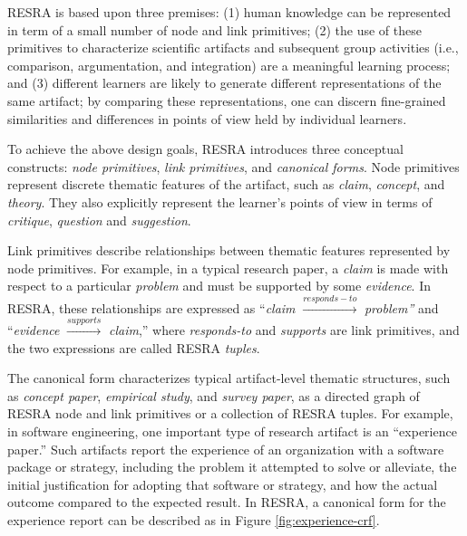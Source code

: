 RESRA is based upon three premises: (1) human knowledge can be represented
in term of a small number of node and link primitives; (2) the use of these
primitives to characterize scientific artifacts and subsequent group
activities (i.e., comparison, argumentation, and integration) are a meaningful
learning process; and (3) different learners are likely to generate
different representations of the same artifact; by comparing these
representations, one can discern fine-grained similarities and differences
in points of view held by individual learners. 

To achieve the above design goals, RESRA introduces three conceptual
constructs: {\it node primitives\/}, {\it link primitives}, and {\it
canonical forms\/}. Node primitives represent discrete thematic features
of the artifact, such as {\it claim\/}, {\it concept\/}, and {\it
theory\/}. They also explicitly represent the learner's points of view in
terms of {\it critique\/}, {\it question\/} and {\it suggestion\/}.

Link primitives describe relationships between thematic features
represented by node primitives. For example, in a typical research paper, a
{\it claim\/} is made with respect to a particular {\it problem\/} and must
be supported by some {\it evidence\/}. In RESRA, these relationships are
expressed as ``{\it claim\/} \( \stackrel{responds-to}{\longrightarrow} \)
{\it problem''\/} and ``{\it evidence\/}
\(\stackrel{supports}{\longrightarrow}\) {\it claim\/},'' where {\it
responds-to\/} and {\it supports\/} are link primitives, and the two
expressions are called RESRA {\it tuples\/}.
   
The canonical form characterizes typical artifact-level thematic
structures, such as {\it concept paper\/}, {\it empirical study\/}, and
{\it survey paper\/}, as a directed graph of RESRA node and link primitives
or a collection of RESRA tuples. For example, in software engineering, one
important type of research artifact is an ``experience paper.'' Such
artifacts report the experience of an organization with a software package
or strategy, including the problem it attempted to solve or alleviate, the
initial justification for adopting that software or strategy, and how the
actual outcome compared to the expected result. In RESRA, a canonical form
for the experience report can be described as in Figure
\ref{fig:experience-crf}.

\begin{quotation}
\end{quotation}

